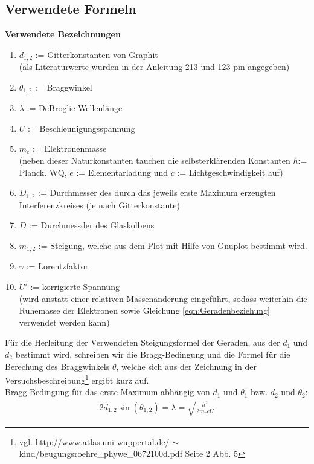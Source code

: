 \documentclass[12pt,a4paper]{article}
\begin{document}
\subsection{Verwendete Formeln}

\textbf{Verwendete Bezeichnungen}
\begin{enumerate}
\item $d_{1,2}$ := Gitterkonstanten von Graphit\\
(als Literaturwerte wurden in der Anleitung 213 und 123 pm angegeben)
\item $\theta_{1,2}$ := Braggwinkel
\item $\lambda$ := DeBroglie-Wellenlänge
\item $U$ := Beschleunigungsspannung
\item $m_e$ := Elektronenmasse\\
(neben dieser Naturkonstanten tauchen die selbsterklärenden Konstanten $h$:= Planck. WQ, $e$ := Elementarladung und $c$ := Lichtgeschwindigkeit auf)
\item $D_{1,2}$ := Durchmesser des durch das jeweils erste Maximum erzeugten Interferenzkreises (je nach Gitterkonstante)
\item $D$ := Durchmessder des Glaskolbens
\item $m_{1,2}$ := Steigung, welche aus dem Plot mit Hilfe von Gnuplot bestimmt wird.
\item $\gamma$ := Lorentzfaktor
\item $U'$ := korrigierte Spannung\\
(wird anstatt einer relativen Massenänderung eingeführt, sodass weiterhin die Ruhemasse der Elektronen sowie Gleichung \ref{eqn:Geradenbeziehung} verwendet werden kann)
\end{enumerate}
Für die Herleitung der Verwendeten Steigungsformel der Geraden, aus der $d_1$ und $d_2$ bestimmt wird, schreiben wir die Bragg-Bedingung und die Formel für die Berechung des Braggwinkels $\theta$, welche sich aus der Zeichnung in der Versuchsbeschreibung\footnote{vgl. http://www.atlas.uni-wuppertal.de/
$\sim$kind/beugungsroehre\_phywe\_0672100d.pdf Seite 2 Abb. 5} ergibt kurz auf.\\
Bragg-Bedingung für das erste Maximum abhängig von $d_1$ und $\theta_1$ bzw. $d_2$ und $\theta_2$:
\begin{align}
2d_{1,2}\sin(\theta_{1,2}) = \lambda =
\sqrt{\frac{h^2}{2m_eeU}}
\end{align}
\end{document}
